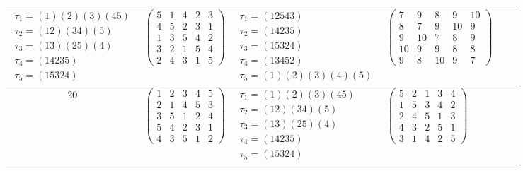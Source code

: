 \begin{longtable}{|c|p{2.7cm}|p{2.7cm}|p{2.7cm}|p{2.7cm}|p{3.3cm}|}
    $\begin{array}{l}\tau_{1}=(1)(2)(3)(45)\\ \tau_{2}=(12)(34)(5)\\ \tau_{3}=(13)(25)(4)\\ \tau_{4}=(14235)\\ \tau_{5}=(15324)\end{array}$     &
    $\begin{pmatrix}5&1&4&2&3\\4&5&2&3&1\\1&3&5&4&2\\3&2&1&5&4\\2&4&3&1&5\end{pmatrix}$                                                         &
    $\begin{array}{l}\tau_{1}=(12543)\\ \tau_{2}=(14235)\\ \tau_{3}=(15324)\\ \tau_{4}=(13452)\\ \tau_{5}=(1)(2)(3)(4)(5)\end{array}$           &
    $\begin{pmatrix}7&9&8&9&10\\8&7&9&10&9\\9&10&7&8&9\\10&9&9&8&8\\9&8&10&9&7\end{pmatrix}$                                                                                                                                \\
    \hline
    20                                                                                                                                          &
    $\begin{pmatrix}1&2&3&4&5\\2&1&4&5&3\\3&5&1&2&4\\5&4&2&3&1\\4&3&5&1&2\end{pmatrix}$                                                         &
    $\begin{array}{l}\tau_{1}=(1)(2)(3)(45)\\ \tau_{2}=(12)(34)(5)\\ \tau_{3}=(13)(25)(4)\\ \tau_{4}=(14235)\\ \tau_{5}=(15324)\end{array}$     &
    $\begin{pmatrix}5&2&1&3&4\\1&5&3&4&2\\2&4&5&1&3\\4&3&2&5&1\\3&1&4&2&5\end{pmatrix}$                                                         &

\end{longtable}
